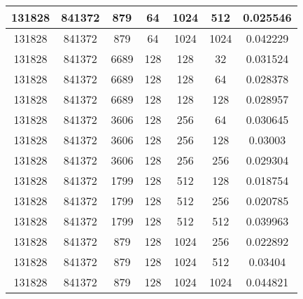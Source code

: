 \documentclass[9pt]{article}
\begin{document}
\begin{tabular}{|c|c|c|c|c|c|c| }
\hline
131828  & 841372  & 879  & 64  & 1024  & 512  & 0.025546 \\
\hline
131828  & 841372  & 879  & 64  & 1024  & 1024  & 0.042229 \\
\hline
131828  & 841372  & 6689  & 128  & 128  & 32  & 0.031524 \\
\hline
131828  & 841372  & 6689  & 128  & 128  & 64  & 0.028378 \\
\hline
131828  & 841372  & 6689  & 128  & 128  & 128  & 0.028957 \\
\hline
131828  & 841372  & 3606  & 128  & 256  & 64  & 0.030645 \\
\hline
131828  & 841372  & 3606  & 128  & 256  & 128  & 0.03003 \\
\hline
131828  & 841372  & 3606  & 128  & 256  & 256  & 0.029304 \\
\hline
131828  & 841372  & 1799  & 128  & 512  & 128  & 0.018754 \\
\hline
131828  & 841372  & 1799  & 128  & 512  & 256  & 0.020785 \\
\hline
131828  & 841372  & 1799  & 128  & 512  & 512  & 0.039963 \\
\hline
131828  & 841372  & 879  & 128  & 1024  & 256  & 0.022892 \\
\hline
131828  & 841372  & 879  & 128  & 1024  & 512  & 0.03404 \\
\hline
131828  & 841372  & 879  & 128  & 1024  & 1024  & 0.044821 \\
\hline
\end{tabular}
 
\end{document}
